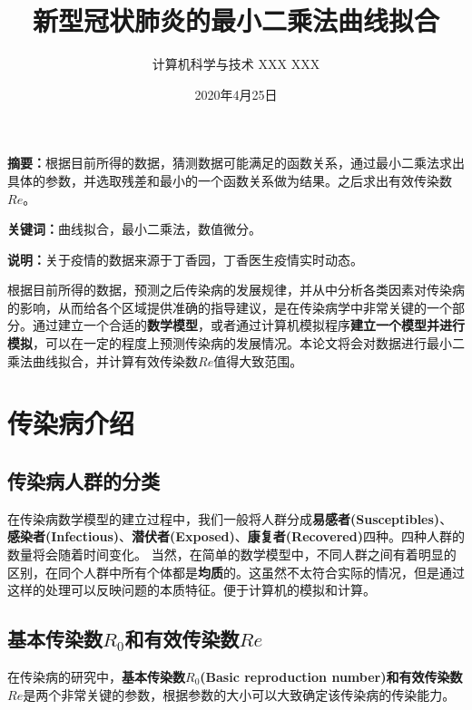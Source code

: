 \documentclass{article}
\title{新型冠状肺炎的最小二乘法曲线拟合}
\author{计算机科学与技术 \quad XXX \quad XXX}
\date{2020年4月25日}
\begin{document}
    \maketitle


    \noindent\textbf{摘要：}根据目前所得的数据，猜测数据可能满足的函数关系，通过最小二乘法求出具体的参数，并选取残差和最小的一个函数关系做为结果。之后求出有效传染数$Re$。
    
    \noindent\textbf{关键词：}曲线拟合，最小二乘法，数值微分。

    \noindent\textbf{说明：}关于疫情的数据来源于丁香园，丁香医生疫情实时动态。

    \begin{multicols}{2}


        根据目前所得的数据，预测之后传染病的发展规律，并从中分析各类因素对传染病的影响，从而给各个区域提供准确的指导建议，是在传染病学中非常关键的一个部分。通过建立一个合适的\textbf{数学模型}，或者通过计算机模拟程序\textbf{建立一个模型并进行模拟}，可以在一定的程度上预测传染病的发展情况。本论文将会对数据进行最小二乘法曲线拟合，并计算有效传染数$Re$值得大致范围。


        \section{传染病介绍}
            \subsection{传染病人群的分类}
                在传染病数学模型的建立过程中，我们一般将人群分成\textbf{易感者(Susceptibles)}、\textbf{感染者(Infectious)}、\textbf{潜伏者(Exposed)}、\textbf{康复者(Recovered)}四种。四种人群的数量将会随着时间变化\cite{model1}。
                当然，在简单的数学模型中，不同人群之间有着明显的区别，在同个人群中所有个体都是\textbf{均质}的。这虽然不太符合实际的情况，但是通过这样的处理可以反映问题的本质特征。便于计算机的模拟和计算。
            \subsection{基本传染数$R_{0}$和有效传染数$Re$}
                在传染病的研究中，\textbf{基本传染数$R_{0}$(Basic reproduction number)和有效传染数$Re$}是两个非常关键的参数\cite{r0}，根据参数的大小可以大致确定该传染病的传染能力。


\end{multicols}
\end{document}
